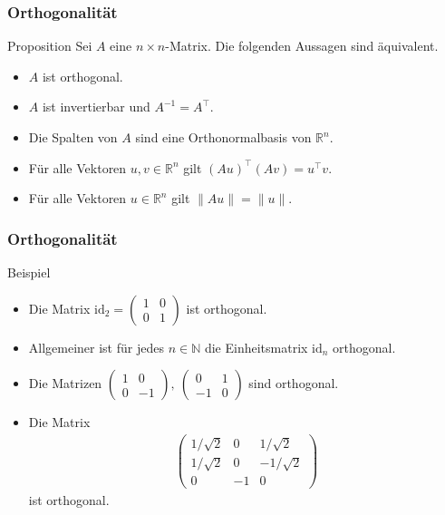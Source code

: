\documentclass{beamer}
\newcommand\NN{\mathbb N}
\newcommand\RR{\mathbb R}
\newcommand{\id}{\mathrm{id}}
\newcommand{\trans}{\top}
\renewcommand{\ae}{\"a}
\newcommand{\ue}{\"u}
\newcommand{\mytitle}{Orthogonalit\ae t}
\begin{document}
\begin{frame}\frametitle{\mytitle}
	\begin{block}{Proposition}
		Sei $A$ eine $n\times n$-Matrix.
		Die folgenden Aussagen sind \ae quivalent.
		\begin{itemize}
			\item $A$ ist orthogonal.
			\item $A$ ist invertierbar und $A^{-1}=A^\trans$.
			\item Die Spalten von $A$ sind eine Orthonormalbasis von $\RR^n$.
			\item F\ue r alle Vektoren $u,v\in\RR^n$ gilt $(Au)^\trans(Av)=u^\trans v$.
			\item F\ue r alle Vektoren $u\in\RR^n$ gilt $\|Au\|=\|u\|$.
		\end{itemize}
	\end{block}
\end{frame}

\begin{frame}\frametitle{\mytitle}
	\begin{block}{Beispiel}
	\begin{itemize}
	\item Die Matrix $\id_2=\begin{pmatrix}1&0\\0&1\end{pmatrix}$ ist orthogonal.
	\item Allgemeiner ist f\ue r jedes $n\in\NN$ die Einheitsmatrix $\id_n$ orthogonal.
	\item Die Matrizen $ \begin{pmatrix}1&0\\0&-1\end{pmatrix},\ \begin{pmatrix}0&1\\-1&0\end{pmatrix} $
		sind orthogonal.
	\item Die Matrix
		\begin{align*}
		\begin{pmatrix}
			1/\sqrt 2&0&1/\sqrt 2\\1/\sqrt 2&0&-1/\sqrt 2\\0&-1&0
		\end{pmatrix}
		\end{align*}
		ist orthogonal.
	\end{itemize}
	\end{block}
\end{frame}
\end{document}

